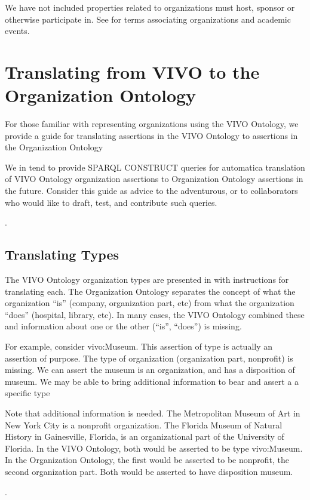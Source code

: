 \documentclass[letterpaper,10pt,english]{sphinxmanual}
\begin{document}
\begin{sphinxShadowBox}

\sphinxAtStartPar
We have not included properties related to organizations must host, sponsor or otherwise
participate in.  See  for terms associating
organizations and academic events.
\end{sphinxShadowBox}


\chapter{Translating from VIVO to the Organization Ontology}
\label{\detokenize{vivo-to-org:translating-from-vivo-to-the-organization-ontology}}\label{\detokenize{vivo-to-org::doc}}
\sphinxAtStartPar
For those familiar with representing organizations using the VIVO Ontology,
we provide a guide for translating assertions in the VIVO Ontology to assertions
in the Organization Ontology %
\begin{footnote}[1]\sphinxAtStartFootnote
We in tend to provide SPARQL CONSTRUCT queries for automatica translation of
VIVO Ontology organization assertions to Organization Ontology assertions
in the future.  Consider this guide as advice to the adventurous, or to collaborators
who would like to draft, test, and contribute such queries.
%
\end{footnote}.


\section{Translating Types}
\label{\detokenize{vivo-to-org:translating-types}}
\sphinxAtStartPar
The VIVO Ontology organization types are presented in {\hyperref[\detokenize{vivo-to-org:table-16}]{}} with instructions
for translating each.  The Organization Ontology separates the concept of
what the organization “is” (company, organization part, etc) from what the
organization “does” (hospital, library, etc).  In many cases, the VIVO Ontology
combined these and information about one or the other (“is”, “does”) is missing.

\sphinxAtStartPar
For example, consider vivo:Museum.  This assertion of type is actually an
assertion of purpose.  The type of organization (organization part, nonprofit) is
missing.  We can assert the museum is an organization, and has a disposition of
museum.  We may be able to bring additional information to bear and assert a
a specific type %
\begin{footnote}[2]\sphinxAtStartFootnote
Note that additional information is needed.  The Metropolitan Museum of Art
in New York City is a nonprofit organization.  The Florida Museum of Natural
History in Gainesville, Florida, is an organizational part of the University of
Florida.  In the VIVO
Ontology, both would be asserted to be type vivo:Museum.  In the Organization
Ontology, the first would be asserted to be nonprofit, the second organization
part.  Both would be asserted to have disposition museum.
%
\end{footnote}.
\end{document}
